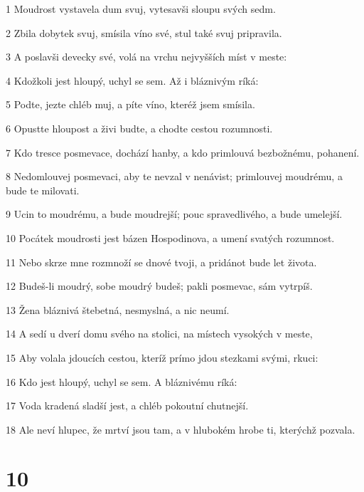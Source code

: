 \par 1 Moudrost vystavela dum svuj, vytesavši sloupu svých sedm.
\par 2 Zbila dobytek svuj, smísila víno své, stul také svuj pripravila.
\par 3 A poslavši devecky své, volá na vrchu nejvyšších míst v meste:
\par 4 Kdožkoli jest hloupý, uchyl se sem. Až i bláznivým ríká:
\par 5 Podte, jezte chléb muj, a píte víno, kteréž jsem smísila.
\par 6 Opustte hloupost a živi budte, a chodte cestou rozumnosti.
\par 7 Kdo tresce posmevace, dochází hanby, a kdo primlouvá bezbožnému, pohanení.
\par 8 Nedomlouvej posmevaci, aby te nevzal v nenávist; primlouvej moudrému, a bude te milovati.
\par 9 Ucin to moudrému, a bude moudrejší; pouc spravedlivého, a bude umelejší.
\par 10 Pocátek moudrosti jest bázen Hospodinova, a umení svatých rozumnost.
\par 11 Nebo skrze mne rozmnoží se dnové tvoji, a pridánot bude let života.
\par 12 Budeš-li moudrý, sobe moudrý budeš; pakli posmevac, sám vytrpíš.
\par 13 Žena bláznivá štebetná, nesmyslná, a nic neumí.
\par 14 A sedí u dverí domu svého na stolici, na místech vysokých v meste,
\par 15 Aby volala jdoucích cestou, kteríž prímo jdou stezkami svými, rkuci:
\par 16 Kdo jest hloupý, uchyl se sem. A bláznivému ríká:
\par 17 Voda kradená sladší jest, a chléb pokoutní chutnejší.
\par 18 Ale neví hlupec, že mrtví jsou tam, a v hlubokém hrobe ti, kterýchž pozvala.

\chapter{10}

